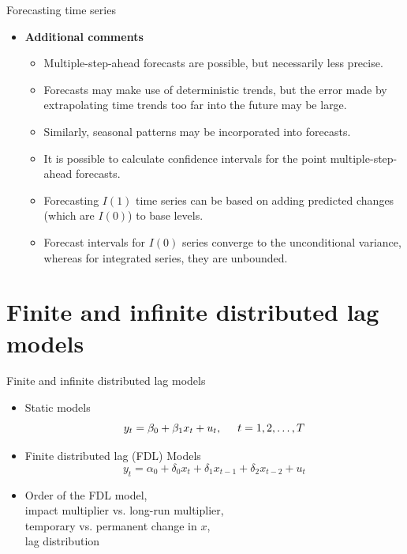 \documentclass{beamer}
\begin{document}
\begin{frame}{Forecasting time series}
\begin{itemize}
\item \textbf{Additional comments}
\begin{itemize}
\item Multiple-step-ahead forecasts are possible, but necessarily less precise.
\item Forecasts may make use of deterministic trends, but the error made  by extrapolating time trends too far into the future may be large.
\item Similarly, seasonal patterns may be incorporated into forecasts.
\item It is possible to calculate confidence intervals for the point multiple-step-ahead forecasts.  
\item Forecasting $I(1)$ time series can be based on adding predicted changes (which are $I(0)$) to base levels. 
\item Forecast intervals for $I(0)$ series converge to the unconditional variance, whereas for integrated series, they are unbounded.
\end{itemize}
\end{itemize}
\end{frame}

\section{Finite and infinite distributed lag models}
\begin{frame}{Finite and infinite distributed lag models}
\begin{itemize}
\item Static models
$$y_t = \beta_0 + \beta_1 x_t + u_t, \hspace{0.5cm} t=1, 2, \dots, T$$
\item Finite distributed lag (FDL) Models 
$$ y_t = \alpha_0 + \delta_0 x_t + \delta_1 x_{t-1} + \delta_2 x_{t-2} + u_t$$
\item Order of the FDL model, \\impact multiplier vs. long-run multiplier, \\temporary vs. permanent change in $x$, 
\\lag distribution
\end{itemize}
\end{frame}

\end{document}
